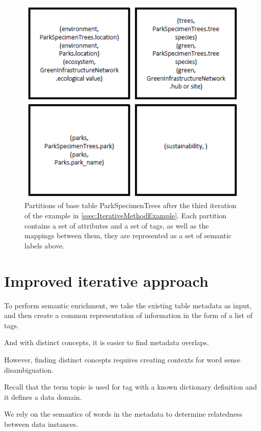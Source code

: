 \begin{figure}
    \centering
    \includegraphics[width=5in]{figures/partitions-park-specimen-trees.png}
    \caption{Partitions of base table ParkSpecimenTrees after the third iteration of the example in \autoref{ssec:IterativeMethodExample}. Each partition contains a set of attributes and a set of tags, as well as the mappings between them, they are represented as a set of semantic labels above.}
    \label{fig:partitions-park-specimen-trees}
\end{figure}

\section{Improved iterative approach}
\label{sec:ImprovedIterativeApproach}

To perform semantic enrichment, we take the existing table metadata as input, and then create a common representation of information in the form of a list of tags.

And with distinct concepts, it is easier to find metadata overlaps.

However, finding distinct concepts requires creating contexts for word sense disambiguation.

Recall that the term topic is used for tag with a known dictionary definition and it defines a data domain.

We rely on the semantics of words in the metadata to determine relatedness between data instances.

